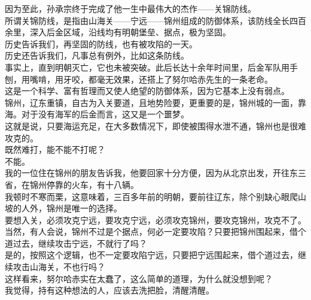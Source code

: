 \begin{multicols}{\theparacolNo}
因为至此，孙承宗终于完成了他一生中最伟大的杰作——关锦防线。\\

所谓关锦防线，是指由山海关——宁远——锦州组成的防御体系，该防线全长四百余里，深入后金区域，沿线均有明朝堡垒、据点，极为坚固。\\

历史告诉我们，再坚固的防线，也有被攻陷的一天。\\

历史还告诉我们，凡事总有例外，比如这条防线。\\

事实上，直到明朝灭亡，它也未被突破。此后长达十余年时间里，后金军队用手刨，用嘴啃，用牙咬，都毫无效果，还搭上了努尔哈赤先生的一条老命。\\

这是一个科学、富有哲理而又使人绝望的防御体系，因为它基本上没有弱点。\\

锦州，辽东重镇，自古为入关要道，且地势险要，更重要的是，锦州城的一面，靠海。对于没有海军的后金而言，这又是一个噩梦。\\

这就是说，只要海运充足，在大多数情况下，即使被围得水泄不通，锦州也是很难攻克的。\\

既然难打，能不能不打呢？\\

不能。\\

我的一位住在锦州的朋友告诉我，他要回家十分方便，因为从北京出发，开往东三省，在锦州停靠的火车，有十八辆。\\

我顿时不寒而栗，这意味着，三百多年前的明朝，要前往辽东，除个别缺心眼爬山坡的人外，锦州是唯一的选择。\\

要想入关，必须攻克宁远，要攻克宁远，必须攻克锦州，要攻克锦州，攻克不了。\\

当然，有人会说，锦州不过是个据点，何必一定要攻陷？只要把锦州围起来，借个道过去，继续攻击宁远，不就行了吗？\\

是的，按照这个逻辑，也不一定要攻陷宁远，只要把宁远围起来，借个道过去，继续攻击山海关，不也行吗？\\

这样看来，努尔哈赤实在太蠢了，这么简单的道理，为什么就没想到呢？\\

我觉得，持有这种想法的人，应该去洗把脸，清醒清醒。\\


\end{multicols}
